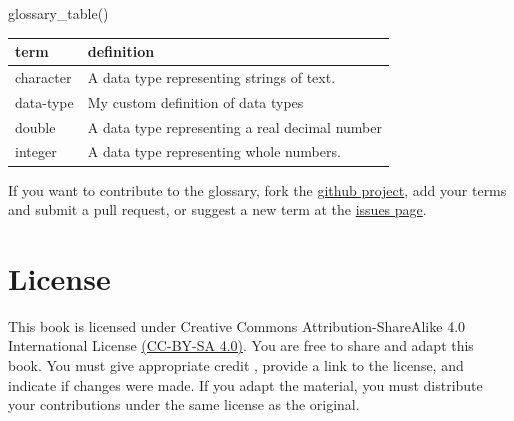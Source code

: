 \documentclass[
  oneside]{book}
\newenvironment{Shaded}{\begin{snugshade}}{\end{snugshade}}
\newcommand{\FunctionTok}[1]{\textcolor[rgb]{0.00,0.00,0.00}{#1}}
\newcommand{\NormalTok}[1]{#1}
\begin{document}
\begin{Shaded}
\begin{Highlighting}[]
\FunctionTok{glossary\_table}\NormalTok{()}
\end{Highlighting}
\end{Shaded}

\begin{tabular}{l|l}
\hline
term & definition\\
\hline
character & A data type representing strings of text.\\
\hline
data-type & My custom definition of data types\\
\hline
double & A data type representing a real decimal number\\
\hline
integer & A data type representing whole numbers.\\
\hline
\end{tabular}

If you want to contribute to the glossary, fork the \href{https://github.com/PsyTeachR/glossary}{github project}, add your terms and submit a pull request, or suggest a new term at the \href{https://github.com/PsyTeachR/glossary/issues}{issues page}.

\hypertarget{license}{%
\chapter*{License}\label{license}}

This book is licensed under Creative Commons Attribution-ShareAlike 4.0 International License \href{https://creativecommons.org/licenses/by-sa/4.0/}{(CC-BY-SA 4.0)}. You are free to share and adapt this book. You must give appropriate credit \citep{psyteachr-template}, provide a link to the license, and indicate if changes were made. If you adapt the material, you must distribute your contributions under the same license as the original.

  
\end{document}
